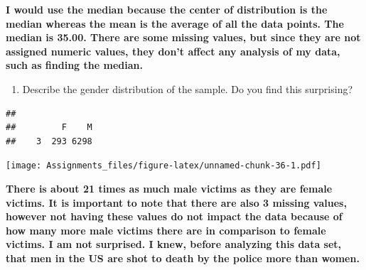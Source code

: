 \documentclass[
]{article}
\newenvironment{Shaded}{\begin{snugshade}}{\end{snugshade}}
\newcommand{\AttributeTok}[1]{\textcolor[rgb]{0.77,0.63,0.00}{#1}}
\newcommand{\CommentTok}[1]{\textcolor[rgb]{0.56,0.35,0.01}{\textit{#1}}}
\newcommand{\ConstantTok}[1]{\textcolor[rgb]{0.00,0.00,0.00}{#1}}
\newcommand{\FunctionTok}[1]{\textcolor[rgb]{0.00,0.00,0.00}{#1}}
\newcommand{\NormalTok}[1]{#1}
\newcommand{\OtherTok}[1]{\textcolor[rgb]{0.56,0.35,0.01}{#1}}
\newcommand{\SpecialCharTok}[1]{\textcolor[rgb]{0.00,0.00,0.00}{#1}}
\newcommand{\StringTok}[1]{\textcolor[rgb]{0.31,0.60,0.02}{#1}}
\providecommand{\tightlist}{%
  \setlength{\itemsep}{0pt}\setlength{\parskip}{0pt}}
\begin{document}
\textbf{I would use the median because the center of distribution is the
median whereas the mean is the average of all the data points. The
median is 35.00. There are some missing values, but since they are not
assigned numeric values, they don't affect any analysis of my data, such
as finding the median. }

\begin{enumerate}
\def\labelenumi{\alph{enumi}.}
\setcounter{enumi}{2}
\tightlist
\item
  Describe the gender distribution of the sample. Do you find this
  surprising?
\end{enumerate}

\begin{Shaded}
\end{Shaded}

\begin{verbatim}
## 
##         F    M 
##    3  293 6298
\end{verbatim}

\begin{Shaded}
\end{Shaded}

\texttt{[image: Assignments\_files/figure-latex/unnamed-chunk-36-1.pdf]}

\textbf{There is about 21 times as much male victims as they are female
victims. It is important to note that there are also 3 missing values,
however not having these values do not impact the data because of how
many more male victims there are in comparison to female victims. I am
not surprised. I knew, before analyzing this data set, that men in the
US are shot to death by the police more than women. }
\end{document}
